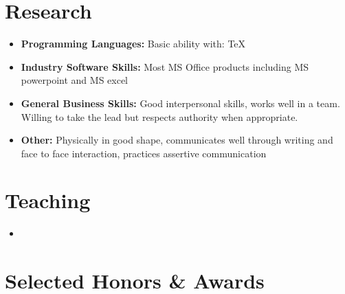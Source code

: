 \documentclass[11pt,a4paper,sans]{moderncv}        %
\begin{document}
\section{Research}

\vspace{6pt}

\begin{itemize}
	
	\item \textbf{Programming Languages:} Basic ability with: TeX
	
	\vspace{6pt}
	
	\item \textbf{Industry Software Skills:} Most MS Office products including MS powerpoint and MS excel
	
	\vspace{6pt}
	
	\item \textbf{General Business Skills:} Good interpersonal skills, works well in a team. Willing to take the lead but respects authority when appropriate.
	
	\vspace{6pt}
	
	\item \textbf{Other:} Physically in good shape, communicates well through writing and face to face interaction, practices assertive communication
	
\end{itemize}


\section{Teaching}

\vspace{6pt}

\begin{itemize}
	\item{}

\end{itemize}

\section{Selected Honors \& Awards}

\vspace{6pt}
\end{document}
